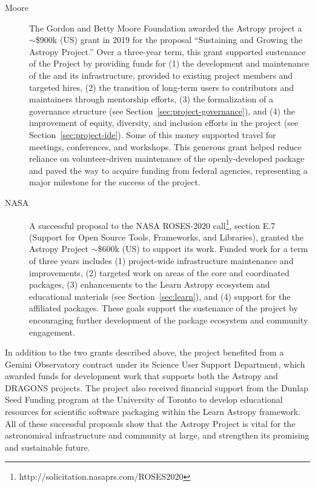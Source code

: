 \documentclass[modern]{aastex631}
\begin{document}
\begin{description}
    \item[Moore] The Gordon and Betty Moore Foundation awarded the Astropy
    project a $\sim$\$900k (US) grant in 2019 for the proposal ``Sustaining and
    Growing the Astropy Project.'' Over a three-year term, this grant supported
    sustenance of the Project by providing funds for (1) the development and
    maintenance of the \astropypkg and its infrastructure, provided to existing
    project members and targeted hires, (2) the transition of long-term users to
    contributors and maintainers through mentorship efforts, (3) the
    formalization of a governance structure (see
    Section~\ref{sec:project-governance}), and (4) the improvement of equity,
    diversity, and inclusion efforts in the project (see
    Section~\ref{sec:project-ide}). Some of this money supported travel for
    meetings, conferences, and workshops. This generous grant helped reduce
    reliance on volunteer-driven maintenance of the openly-developed package and
    paved the way to acquire funding from federal agencies, representing a major
    milestone for the success of the project.

    \item[NASA] A successful proposal to the NASA ROSES-2020
    call\footnote{http://solicitation.nasaprs.com/ROSES2020}, section E.7
    (Support for Open Source Tools, Frameworks, and Libraries), granted the
    Astropy Project $\sim$\$600k (US) to support its work. Funded work for a
    term of three years includes (1) project-wide infrastructure maintenance and
    improvements, (2) targeted work on areas of the \astropy core and
    coordinated packages, (3) enhancements to the Learn
    Astropy ecosystem and educational materials (see Section~\ref{sec:learn}),
    and (4) support for the \astropy affiliated packages. These goals
    support the sustenance of the project by encouraging further
    development of the package ecosystem and community engagement.
\end{description}

In addition to the two grants described above, the project benefited from
a Gemini Observatory contract under its Science User Support Department,
which awarded funds for development work that supports both the Astropy and
DRAGONS projects. The project also received financial support from the Dunlap
Seed Funding program at the University of Toronto to develop educational
resources for scientific software packaging within the Learn Astropy
framework. All of these successful proposals show that the Astropy Project
is vital for the astronomical infrastructure and community at large, and
strengthen its promising and sustainable future.
\end{document}

